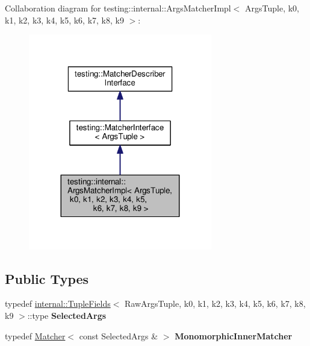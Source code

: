 Collaboration diagram for testing\+:\+:internal\+:\+:Args\+Matcher\+Impl$<$ Args\+Tuple, k0, k1, k2, k3, k4, k5, k6, k7, k8, k9 $>$\+:\nopagebreak
\begin{figure}[H]
\begin{center}
\leavevmode
\includegraphics[width=227pt]{classtesting_1_1internal_1_1ArgsMatcherImpl__coll__graph}
\end{center}
\end{figure}
\subsection*{Public Types}
\begin{DoxyCompactItemize}
\item 
typedef \hyperlink{classtesting_1_1internal_1_1TupleFields}{internal\+::\+Tuple\+Fields}$<$ Raw\+Args\+Tuple, k0, k1, k2, k3, k4, k5, k6, k7, k8, k9 $>$\+::type {\bfseries Selected\+Args}\hypertarget{classtesting_1_1internal_1_1ArgsMatcherImpl_ab061679f6251e56ccbedaf0c316d00ff}{}\label{classtesting_1_1internal_1_1ArgsMatcherImpl_ab061679f6251e56ccbedaf0c316d00ff}

\item 
typedef \hyperlink{classtesting_1_1Matcher}{Matcher}$<$ const Selected\+Args \& $>$ {\bfseries Monomorphic\+Inner\+Matcher}\hypertarget{classtesting_1_1internal_1_1ArgsMatcherImpl_ab90d2c074b2072d6c39bf26209fb941f}{}\label{classtesting_1_1internal_1_1ArgsMatcherImpl_ab90d2c074b2072d6c39bf26209fb941f}

\end{DoxyCompactItemize}
